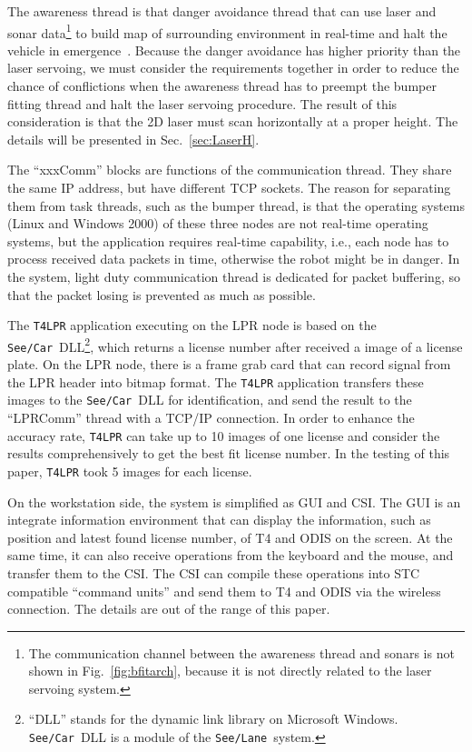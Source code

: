 \documentclass[]{spie}
\def\t4lpr{\texttt{T4LPR}}
\def\seelane{\texttt{See/Lane}\ }
\def\seecar{\texttt{See/Car}\ }
\begin{document}
    The awareness thread is that danger avoidance thread that can use laser and sonar data\footnote{The communication channel between the awareness thread and sonars is not shown in Fig.~\ref{fig:bfitarch}, because it is not directly related to the laser servoing system.} to build map of surrounding environment in real-time and halt the vehicle in emergence~\cite{MaHIMM}. Because the danger avoidance has higher priority than the laser servoing, we must consider the requirements together in order to reduce the chance of conflictions when the awareness thread has to preempt the bumper fitting thread and halt the laser servoing procedure. The result of this consideration is that the 2D laser must scan horizontally at a proper height. The details will be presented in Sec.~\ref{sec:LaserH}.

    The ``xxxComm'' blocks are functions of the communication thread. They share the same IP address, but have different TCP sockets. The reason for separating them from task threads, such as the bumper thread, is that the operating systems (Linux and Windows 2000) of these three nodes are not real-time operating systems, but the application requires real-time capability, i.e., each node has to process received data packets in time, otherwise the robot might be in danger. In the system, light duty communication thread is dedicated for packet buffering, so that the packet losing is prevented as much as possible.

    The \t4lpr application executing on the LPR node is based on the \seecar DLL\footnote{``DLL'' stands for the dynamic link library on Microsoft Windows. \seecar DLL is a module of the \seelane system.}, which returns a license number after received a image of a license plate. On the LPR node, there is a frame grab card that can record signal from the LPR header into bitmap format. The \t4lpr application transfers these images to the \seecar DLL for identification, and send the result to the ``LPRComm'' thread with a TCP/IP connection. In order to enhance the accuracy rate, \t4lpr can take up to 10 images of one license and consider the results comprehensively to get the best fit license number. In the testing of this paper, \t4lpr took 5 images for each license.

    On the workstation side, the system is simplified as GUI and CSI. The GUI is an integrate information environment that can display the information, such as position and latest found license number, of T4 and ODIS on the screen. At the same time, it can also receive operations from the keyboard and the mouse, and transfer them to the CSI. The CSI can compile these operations into STC compatible ``command units'' and send them to T4 and ODIS via the wireless connection. The details are out of the range of this paper.
\end{document}
